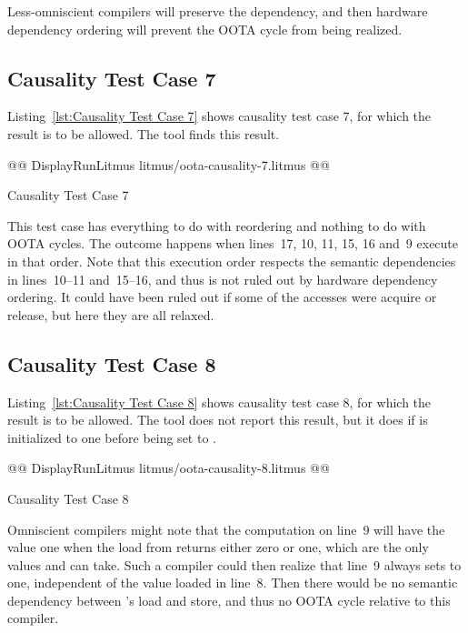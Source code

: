 \documentclass[10]{article}
\begin{document}
Less-omniscient compilers will preserve the dependency, and then
hardware dependency ordering will prevent the OOTA cycle from
being realized.

\subsection{Causality Test Case 7}
\label{app:Causality Test Case 7}

Listing~\ref{lst:Causality Test Case 7}
shows causality test case 7, for which the 
result is to be allowed.
The  tool finds this result.

\begin{listing}[tbp]
@@ DisplayRunLitmus litmus/oota-causality-7.litmus @@
\caption{Causality Test Case 7}
\label{lst:Causality Test Case 7}
\end{listing}

This test case has everything
to do with reordering and nothing to do with OOTA cycles.
The  outcome happens when lines~17, 10, 11,
15, 16 and~9 execute in that order.
Note that this execution order respects the semantic dependencies in
lines~10--11 and~15--16, and thus is not ruled out by hardware
dependency ordering.
It could have been ruled out if some of the accesses were acquire or
release, but here they are all relaxed.

\subsection{Causality Test Case 8}
\label{app:Causality Test Case 8}

Listing~\ref{lst:Causality Test Case 8}
shows causality test case 8, for which the 
result is to be allowed.
The  tool does not report this result, but it does if
 is initialized to one before being set to
.

\begin{listing}[tbp]
@@ DisplayRunLitmus litmus/oota-causality-8.litmus @@
\caption{Causality Test Case 8}
\label{lst:Causality Test Case 8}
\end{listing}

Omniscient compilers might note that the computation on line~9
will have the value one when the load from  returns either
zero or one, which are the only values  and  can take.
Such a compiler could then realize that line~9 always sets  to one,
independent of the value loaded in line~8.
Then there would be no semantic dependency between 's load
and store, and thus no OOTA cycle relative to this compiler.
\end{document}
